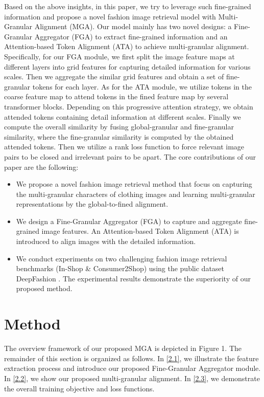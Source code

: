 \documentclass[10pt,twocolumn,letterpaper]{article}
\begin{document}
\par Based on the above insights, in this paper, we try to leverage such fine-grained information and propose a novel fashion image retrieval model with Multi-Granular Alignment (MGA). Our model mainly has two novel designs: a Fine-Granular Aggregator (FGA) to extract fine-grained information and an Attention-based Token Alignment (ATA) to achieve multi-granular alignment. Specifically, for our FGA module, we first split the image feature maps at different layers into grid features for capturing detailed information for various scales. Then we aggregate the similar grid features and obtain a set of fine-granular tokens for each layer. As for the ATA module, we utilize tokens in the coarse feature map to attend tokens in the fined feature map by several transformer blocks. Depending on this progressive attention strategy, we obtain attended tokens containing detail information at different scales. Finally we compute the overall similarity by fusing global-granular and fine-granular similarity, where the fine-granular similarity is computed by the obtained attended tokens. Then we utilize a rank loss function to force relevant image pairs to be closed and irrelevant pairs to be apart. The core contributions of our paper are the following:
\begin{itemize}
    \item We propose a novel fashion image retrieval method that focus on capturing the multi-granular characters of clothing images and learning multi-granular representations by the global-to-fined alignment.
    \item We design a Fine-Granular Aggregator (FGA) to capture and aggregate fine-grained image features. An Attention-based Token Alignment (ATA) is introduced to align images with the detailed information. 
    \item We conduct experiments on two challenging fashion image retrieval benchmarks (In-Shop \& Consumer2Shop) using the public dataset DeepFashion \cite{deepfashion}. The experimental results demonstrate the superiority of our proposed method. 
\end{itemize}

\section{Method}
\label{sec:method}
The overview framework of our proposed MGA is depicted in Figure 1. The remainder of this section is organized as follows. In \cref{2.1}, we illustrate the feature extraction process and introduce our proposed Fine-Granular Aggregator module. In \cref{2.2}, we show our proposed multi-granular alignment. In \cref{2.3}, we demonstrate the overall training objective and loss functions.
\end{document}
